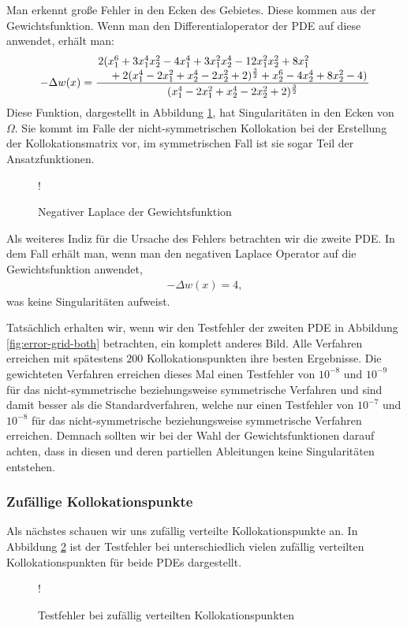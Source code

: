 Man erkennt große Fehler in den Ecken des Gebietes. Diese kommen aus der Gewichtsfunktion. Wenn man den Differentialoperator der \ac{PDE} auf diese anwendet, erhält man:
\begin{align*}
-\Delta w(x) = \frac{\splitfrac{ 2(x_1^6+3x_1^4x_2^2-4x_1^4+3x_1^2x_2^4-12x_1^2x_2^2+8x_1^2}{+2(x_1^4-2x_1^2+x_2^4-2x_2^2+2)^{\frac{3}{2}}+x_2^6-4x_2^4+8x_2^2-4)}}{(x_1^4-2x_1^2+x_2^4-2x_2^2+2)^{\frac{3}{2}}}
\end{align*}
Diese Funktion, dargestellt in Abbildung \ref{fig:Gewicht}, hat Singularitäten in den Ecken von $\Omega$. Sie kommt im Falle der nicht-symmetrischen Kollokation bei der Erstellung der Kollokationsmatrix vor, im symmetrischen Fall ist sie sogar Teil der Ansatzfunktionen.
\begin{figure}[H]
\centering
\resizebox {.7\columnwidth} {!} {

}
\caption{Negativer Laplace der Gewichtsfunktion}
\label{fig:Gewicht}
\end{figure}
Als weiteres Indiz für die Ursache des Fehlers betrachten wir die zweite \ac{PDE}. In dem Fall erhält man, wenn man den negativen Laplace Operator auf die Gewichtsfunktion anwendet,
\begin{align*}
- \Delta w(x) = 4,
\end{align*}
was keine Singularitäten aufweist.

Tatsächlich erhalten wir, wenn wir den Testfehler der zweiten \ac{PDE} in Abbildung \ref{fig:error-grid-both} betrachten, ein komplett anderes Bild. Alle Verfahren erreichen mit spätestens $200$ Kollokationspunkten ihre besten Ergebnisse. Die gewichteten Verfahren erreichen dieses Mal einen Testfehler von $10^{-8}$ und $10^{-9}$ für das nicht-symmetrische beziehungsweise symmetrische Verfahren und sind damit besser als die Standardverfahren, welche nur einen Testfehler von $10^{-7}$ und $10^{-8}$ für das nicht-symmetrische beziehungsweise symmetrische Verfahren erreichen. Demnach sollten wir bei der Wahl der Gewichtsfunktionen darauf achten, dass in diesen und deren partiellen Ableitungen keine Singularitäten entstehen.

\subsubsection{Zufällige Kollokationspunkte}
Als nächstes schauen wir uns zufällig verteilte Kollokationspunkte an. In Abbildung \ref{fig:error-random} ist der Testfehler bei unterschiedlich vielen zufällig verteilten Kollokationspunkten für beide \acp{PDE} dargestellt.
\begin{figure}[ht]
\centering
\resizebox {\columnwidth} {!} {

}
\caption{Testfehler bei zufällig verteilten Kollokationspunkten}
\label{fig:error-random}
\end{figure}

